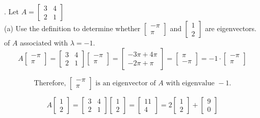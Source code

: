 \documentclass{article} %
\begin{document}
{    . Let $ A = \begin{bmatrix} 3 & 4 \\ 2 & 1 \end{bmatrix} $ \\ %
    (a) Use the definition to determine whether $ \begin{bmatrix} -\pi \\ \pi \end{bmatrix} $ and $ \begin{bmatrix} 1 \\ 2 \end{bmatrix} $
    are eigenvectors. of $ A $ associated with $ \lambda = -1 $. \\

    \[
        A \begin{bmatrix} -\pi \\ \pi \end{bmatrix}
        = \begin{bmatrix} 3 & 4 \\ 2 & 1 \end{bmatrix}
        \begin{bmatrix} -\pi \\ \pi \end{bmatrix}
        = \begin{bmatrix} -3\pi + 4\pi \\ -2\pi + \pi \end{bmatrix}
        = \begin{bmatrix} \pi \\ -\pi \end{bmatrix}
        = -1 \cdot \begin{bmatrix} -\pi \\ \pi \end{bmatrix}
    \]

    \[
        \text{Therefore, } \begin{bmatrix} -\pi \\ \pi \end{bmatrix} \text{ is an eigenvector of } A \text{ with eigenvalue } -1.
    \]

    \[
        A \begin{bmatrix} 1 \\ 2 \end{bmatrix}
        = \begin{bmatrix} 3 & 4 \\ 2 & 1 \end{bmatrix}
        \begin{bmatrix} 1 \\ 2 \end{bmatrix}
        = \begin{bmatrix} 11 \\ 4 \end{bmatrix}
        = 2 \begin{bmatrix} 1 \\ 2 \end{bmatrix}
        + \begin{bmatrix} 9 \\ 0 \end{bmatrix}
    \]

}
\end{document}
